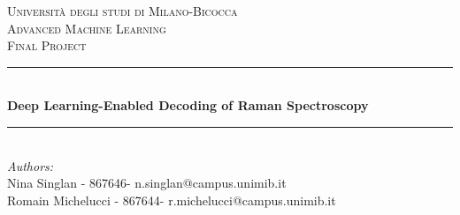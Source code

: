 \begin{titlepage}

\newcommand{\HRule}{\rule{\linewidth}{0.5mm}} %

\center %
 

\textsc{\LARGE Università degli studi di Milano-Bicocca}\\[1cm] %
\textsc{\Large Advanced Machine Learning }\\[0.3cm] %
\textsc{\large Final Project}\\[0.1cm] %


\HRule \\[0.4cm]
{ \huge \bfseries Deep Learning-Enabled Decoding of Raman Spectroscopy}\\[0.2cm] %
\HRule \\[1cm]
 

\large
\emph{Authors:}\\
Nina Singlan - 867646- n.singlan@campus.unimib.it \\   %
Romain Michelucci - 867644- r.michelucci@campus.unimib.it   \\[1cm] %




\end{titlepage}
